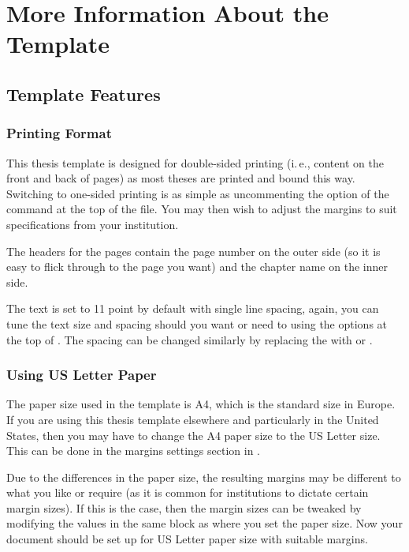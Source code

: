  
\chapter{More Information About the Template}

\section{Template Features}\label{ThesisFeatures}

\subsection{Printing Format}

This thesis template is designed for double-sided printing (i.\,e., content on the front and back of pages) as most theses are printed and bound this way. Switching to one-sided printing is as simple as uncommenting the  option of the  command at the top of the  file. You may then wish to adjust the margins to suit specifications from your institution.

The headers for the pages contain the page number on the outer side (so it is easy to flick through to the page you want) and the chapter name on the inner side.

The text is set to 11 point by default with single line spacing, again, you can tune the text size and spacing should you want or need to using the options at the top of . The spacing can be changed similarly by replacing the  with  or .

\subsection{Using US Letter Paper}

The paper size used in the template is A4, which is the standard size in Europe. If you are using this thesis template elsewhere and particularly in the United States, then you may have to change the A4 paper size to the US Letter size. This can be done in the margins settings section in .

Due to the differences in the paper size, the resulting margins may be different to what you like or require (as it is common for institutions to dictate certain margin sizes). If this is the case, then the margin sizes can be tweaked by modifying the values in the same block as where you set the paper size. Now your document should be set up for US Letter paper size with suitable margins.

